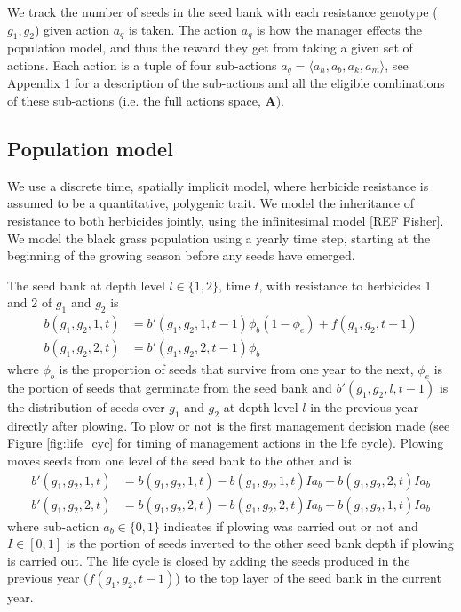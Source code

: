 \documentclass[12pt, a4paper]{article}
\begin{document}
We track the number of seeds in the seed bank with each resistance genotype ($g_1, g_2$) given action $a_q$ is taken. The action $a_q$ is how the manager effects the population model, and thus the reward they get from taking a given set of actions. Each action is a tuple of four sub-actions $a_q = \langle a_h, a_b, a_k, a_m \rangle$, see Appendix 1 for a description of the sub-actions and all the eligible combinations of these sub-actions (i.e. the full actions space, $\mathbf{A}$).   

\subsection*{Population model}
We use a discrete time, spatially implicit model, where herbicide resistance is assumed to be a quantitative, polygenic trait. We model the inheritance of resistance to both herbicides jointly, using the infinitesimal model [REF Fisher]. We model the black grass population using a yearly time step, starting at the beginning of the growing season before any seeds have emerged.

The seed bank at depth level $l \in \{1, 2\}$, time $t$, with resistance to herbicides 1 and 2 of $g_1$ and $g_2$ is 
\begin{subequations}
\label{eq:sb}
\begin{align}
	b(g_1, g_2, 1, t) &= b'(g_1, g_2, 1, t - 1)\phi_b (1 - \phi_e) + f(g_1, g_2, t-1)\\
	b(g_1, g_2, 2, t) &= b'(g_1, g_2, 2, t - 1)\phi_b	 
\end{align}      
\end{subequations} 
where $\phi_b$ is the proportion of seeds that survive from one year to the next, $\phi_e$ is the portion of seeds that germinate from the seed bank and $b'(g_1, g_2, l, t - 1)$ is the distribution of seeds over $g_1$ and $g_2$ at depth level $l$ in the previous year directly after plowing. To plow or not is the first management decision made (see Figure \ref{fig:life_cyc} for timing of management actions in the life cycle). Plowing moves seeds from one level of the seed bank to the other and is
\begin{subequations}
\label{eq:sb_pp}
\begin{align}
	b'(g_1, g_2, 1, t) &= b(g_1, g_2, 1, t) - b(g_1, g_2, 1, t) I a_b + b(g_1, g_2, 2, t) I a_b \\
	b'(g_1, g_2, 2, t) &= b(g_1, g_2, 2, t) - b(g_1, g_2, 2, t) I a_b + b(g_1, g_2, 1, t) I a_b
\end{align}
\end{subequations} 
where sub-action $a_b \in \{0, 1\}$ indicates if plowing was carried out or not and $I \in [0, 1]$ is the portion of seeds inverted to the other seed bank depth if plowing is carried out. The life cycle is closed by adding the seeds produced in the previous year ($f(g_1, g_2, t - 1)$) to the top layer of the seed bank in the current year.
\end{document}
